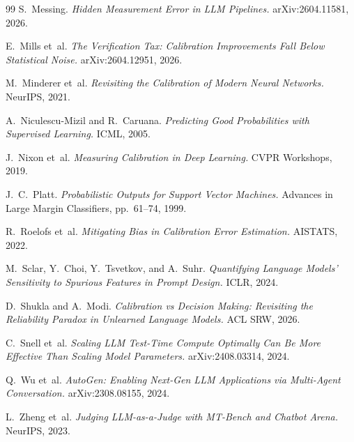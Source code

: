 \documentclass[11pt]{article}
\begin{document}
\begin{thebibliography}{99}
 S.~Messing.
\newblock \textit{Hidden Measurement Error in LLM Pipelines.}
\newblock arXiv:2604.11581, 2026.

 E.~Mills et~al.
\newblock \textit{The Verification Tax: Calibration Improvements Fall Below Statistical Noise.}
\newblock arXiv:2604.12951, 2026.

 M.~Minderer et~al.
\newblock \textit{Revisiting the Calibration of Modern Neural Networks.}
\newblock NeurIPS, 2021.

 A.~Niculescu-Mizil and R.~Caruana.
\newblock \textit{Predicting Good Probabilities with Supervised Learning.}
\newblock ICML, 2005.

 J.~Nixon et~al.
\newblock \textit{Measuring Calibration in Deep Learning.}
\newblock CVPR Workshops, 2019.

 J.~C.~Platt.
\newblock \textit{Probabilistic Outputs for Support Vector Machines.}
\newblock Advances in Large Margin Classifiers, pp.~61--74, 1999.

 R.~Roelofs et~al.
\newblock \textit{Mitigating Bias in Calibration Error Estimation.}
\newblock AISTATS, 2022.

 M.~Sclar, Y.~Choi, Y.~Tsvetkov, and A.~Suhr.
\newblock \textit{Quantifying Language Models' Sensitivity to Spurious Features in Prompt Design.}
\newblock ICLR, 2024.

 D.~Shukla and A.~Modi.
\newblock \textit{Calibration vs Decision Making: Revisiting the Reliability Paradox in Unlearned Language Models.}
\newblock ACL SRW, 2026.

 C.~Snell et~al.
\newblock \textit{Scaling LLM Test-Time Compute Optimally Can Be More Effective Than Scaling Model Parameters.}
\newblock arXiv:2408.03314, 2024.

 Q.~Wu et~al.
\newblock \textit{AutoGen: Enabling Next-Gen LLM Applications via Multi-Agent Conversation.}
\newblock arXiv:2308.08155, 2024.

 L.~Zheng et~al.
\newblock \textit{Judging LLM-as-a-Judge with MT-Bench and Chatbot Arena.}
\newblock NeurIPS, 2023.

\end{thebibliography}
\end{document}
